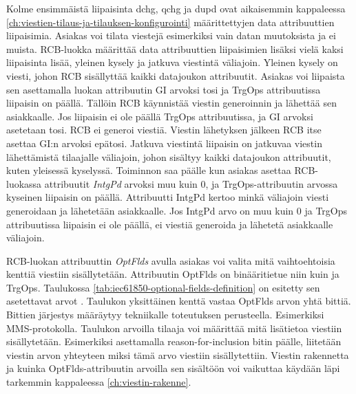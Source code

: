 Kolme ensimmäistä liipaisinta dchg, qchg ja dupd ovat aikaisemmin kappaleessa \ref{ch:viestien-tilaus-ja-tilauksen-konfigurointi} määrittettyjen data attribuuttien liipaisimia. Asiakas voi tilata viestejä esimerkiksi vain datan muutoksista ja ei muista. RCB-luokka määrittää data attribuuttien liipaisimien lisäksi vielä kaksi liipaisinta lisää, yleinen kysely ja jatkuva viestintä väliajoin. Yleinen kysely on viesti, johon RCB sisällyttää kaikki datajoukon attribuutit. Asiakas voi liipaista sen asettamalla luokan attribuutin GI arvoksi tosi ja TrgOps attribuutissa liipaisin on päällä. Tällöin RCB käynnistää viestin generoinnin ja lähettää sen asiakkaalle. Jos liipaisin ei ole päällä TrgOps attribuutissa, ja GI arvoksi asetetaan tosi. RCB ei generoi viestiä. Viestin lähetyksen jälkeen RCB itse asettaa GI:n arvoksi epätosi. Jatkuva viestintä liipaisin on jatkuvaa viestin lähettämistä tilaajalle väliajoin, johon sisältyy kaikki datajoukon attribuutit, kuten yleisessä kyselyssä. Toiminnon saa päälle kun asiakas asettaa RCB-luokassa attribuutit \emph{IntgPd} arvoksi muu kuin 0, ja TrgOps-attribuutin arvossa kyseinen liipaisin on päällä. Attribuutti IntgPd kertoo minkä väliajoin viesti generoidaan ja lähetetään asiakkaalle. Jos IntgPd arvo on muu kuin 0 ja TrgOps attribuutissa liipaisin ei ole päällä, ei viestiä generoida ja lähetetä asiakkaalle väliajoin.

RCB-luokan attribuuttin \emph{OptFlds} avulla asiakas voi valita mitä vaihtoehtoisia kenttiä viestiin sisällytetään. Attribuutin OptFlds on binääritietue niin kuin ja TrgOps. Taulukossa \ref{tab:iec61850-optional-fields-definition} on esitetty sen asetettavat arvot \mbox{\cite[s.~98]{IEC61850-7-2}}. Taulukon yksittäinen kenttä vastaa OptFlds arvon yhtä bittiä. Bittien järjestys määräytyy tekniikalle toteutuksen perusteella. Esimerkiksi MMS-protokolla. Taulukon arvoilla tilaaja voi määrittää mitä lisätietoa viestiin sisällytetään. Esimerkiksi asettamalla reason-for-inclusion bitin päälle, liitetään viestin arvon yhteyteen miksi tämä arvo viestiin sisällytettiin. Viestin rakennetta ja kuinka OptFlds-attribuutin arvoilla sen sisältöön voi vaikuttaa käydään läpi tarkemmin kappaleessa \ref{ch:viestin-rakenne}.

